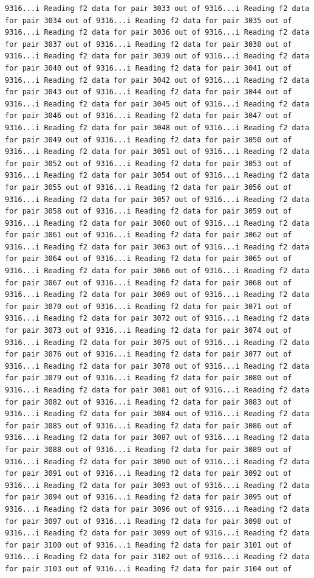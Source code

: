 \documentclass[
]{article}
\begin{document}
\begin{verbatim}
9316...i Reading f2 data for pair 3033 out of 9316...i Reading f2 data for pair 3034 out of 9316...i Reading f2 data for pair 3035 out of 9316...i Reading f2 data for pair 3036 out of 9316...i Reading f2 data for pair 3037 out of 9316...i Reading f2 data for pair 3038 out of 9316...i Reading f2 data for pair 3039 out of 9316...i Reading f2 data for pair 3040 out of 9316...i Reading f2 data for pair 3041 out of 9316...i Reading f2 data for pair 3042 out of 9316...i Reading f2 data for pair 3043 out of 9316...i Reading f2 data for pair 3044 out of 9316...i Reading f2 data for pair 3045 out of 9316...i Reading f2 data for pair 3046 out of 9316...i Reading f2 data for pair 3047 out of 9316...i Reading f2 data for pair 3048 out of 9316...i Reading f2 data for pair 3049 out of 9316...i Reading f2 data for pair 3050 out of 9316...i Reading f2 data for pair 3051 out of 9316...i Reading f2 data for pair 3052 out of 9316...i Reading f2 data for pair 3053 out of 9316...i Reading f2 data for pair 3054 out of 9316...i Reading f2 data for pair 3055 out of 9316...i Reading f2 data for pair 3056 out of 9316...i Reading f2 data for pair 3057 out of 9316...i Reading f2 data for pair 3058 out of 9316...i Reading f2 data for pair 3059 out of 9316...i Reading f2 data for pair 3060 out of 9316...i Reading f2 data for pair 3061 out of 9316...i Reading f2 data for pair 3062 out of 9316...i Reading f2 data for pair 3063 out of 9316...i Reading f2 data for pair 3064 out of 9316...i Reading f2 data for pair 3065 out of 9316...i Reading f2 data for pair 3066 out of 9316...i Reading f2 data for pair 3067 out of 9316...i Reading f2 data for pair 3068 out of 9316...i Reading f2 data for pair 3069 out of 9316...i Reading f2 data for pair 3070 out of 9316...i Reading f2 data for pair 3071 out of 9316...i Reading f2 data for pair 3072 out of 9316...i Reading f2 data for pair 3073 out of 9316...i Reading f2 data for pair 3074 out of 9316...i Reading f2 data for pair 3075 out of 9316...i Reading f2 data for pair 3076 out of 9316...i Reading f2 data for pair 3077 out of 9316...i Reading f2 data for pair 3078 out of 9316...i Reading f2 data for pair 3079 out of 9316...i Reading f2 data for pair 3080 out of 9316...i Reading f2 data for pair 3081 out of 9316...i Reading f2 data for pair 3082 out of 9316...i Reading f2 data for pair 3083 out of 9316...i Reading f2 data for pair 3084 out of 9316...i Reading f2 data for pair 3085 out of 9316...i Reading f2 data for pair 3086 out of 9316...i Reading f2 data for pair 3087 out of 9316...i Reading f2 data for pair 3088 out of 9316...i Reading f2 data for pair 3089 out of 9316...i Reading f2 data for pair 3090 out of 9316...i Reading f2 data for pair 3091 out of 9316...i Reading f2 data for pair 3092 out of 9316...i Reading f2 data for pair 3093 out of 9316...i Reading f2 data for pair 3094 out of 9316...i Reading f2 data for pair 3095 out of 9316...i Reading f2 data for pair 3096 out of 9316...i Reading f2 data for pair 3097 out of 9316...i Reading f2 data for pair 3098 out of 9316...i Reading f2 data for pair 3099 out of 9316...i Reading f2 data for pair 3100 out of 9316...i Reading f2 data for pair 3101 out of 9316...i Reading f2 data for pair 3102 out of 9316...i Reading f2 data for pair 3103 out of 9316...i Reading f2 data for pair 3104 out of 
\end{verbatim}
\end{document}
